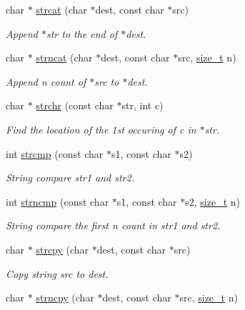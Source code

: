 \begin{DoxyCompactItemize}
char $\ast$ \mbox{\hyperlink{a00038_adb8723e585ed29f2370cddf90f6891bc}{strcat}} (char $\ast$dest, const char $\ast$src)
\begin{DoxyCompactList}\small\item\em Append $\ast$str to the end of $\ast$dest. \end{DoxyCompactList}\item 
char $\ast$ \mbox{\hyperlink{a00038_a0aee928c2844a269966e4832fd2255c5}{strncat}} (char $\ast$dest, const char $\ast$src, \mbox{\hyperlink{a00038_a43b4547e12226fef871eed8afe191ad7}{size\+\_\+t}} n)
\begin{DoxyCompactList}\small\item\em Append n count of $\ast$src to $\ast$dest. \end{DoxyCompactList}\item 
char $\ast$ \mbox{\hyperlink{a00038_afcd97f487174f9092b0f23c7ac78a55a}{strchr}} (const char $\ast$str, int c)
\begin{DoxyCompactList}\small\item\em Find the location of the 1st occuring of c in $\ast$str. \end{DoxyCompactList}\item 
int \mbox{\hyperlink{a00038_a11bd144d7d44914099a3aeddf1c8567d}{strcmp}} (const char $\ast$s1, const char $\ast$s2)
\begin{DoxyCompactList}\small\item\em String compare str1 and str2. \end{DoxyCompactList}\item 
int \mbox{\hyperlink{a00038_a07f4a84c11c106e95c32b6ab509346ef}{strncmp}} (const char $\ast$s1, const char $\ast$s2, \mbox{\hyperlink{a00038_a43b4547e12226fef871eed8afe191ad7}{size\+\_\+t}} n)
\begin{DoxyCompactList}\small\item\em String compare the first n count in str1 and str2. \end{DoxyCompactList}\item 
char $\ast$ \mbox{\hyperlink{a00038_a7a82515b5d377be04817715c5465b647}{strcpy}} (char $\ast$dest, const char $\ast$src)
\begin{DoxyCompactList}\small\item\em Copy string src to dest. \end{DoxyCompactList}\item 
char $\ast$ \mbox{\hyperlink{a00038_a47d54f24198df56da51078a6c540b9ed}{strncpy}} (char $\ast$dest, const char $\ast$src, \mbox{\hyperlink{a00038_a43b4547e12226fef871eed8afe191ad7}{size\+\_\+t}} n)

\end{DoxyCompactItemize}
